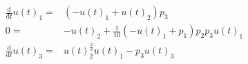 \begin{align}
\frac{\mathrm{d}}{\mathrm{d}t} u(t)_1 =& \left(  - u(t)_1 + u(t)_2 \right) p_3 \\
0 =&  - u(t)_2 + \frac{1}{10} \left(  - u(t)_1 + p_1 \right) p_2 p_3 u(t)_1 \\
\frac{\mathrm{d}}{\mathrm{d}t} u(t)_3 =& u(t)_2^{\frac{2}{3}} u(t)_1 - p_3 u(t)_3
\end{align}
